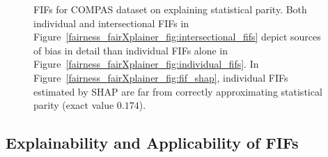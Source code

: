 \begin{figure}
	
	\caption[FIFs for COMPAS dataset]{FIFs for COMPAS dataset on explaining statistical parity. Both individual and intersectional FIFs in Figure~\ref{fairness_fairXplainer_fig:intersectional_fifs} depict sources of bias in detail than individual FIFs alone in Figure~\ref{fairness_fairXplainer_fig:individual_fifs}. In Figure~\ref{fairness_fairXplainer_fig:fif_shap}, individual FIFs estimated by SHAP are far from correctly approximating statistical parity (exact value $0.174 $).}
	\label{fairness_fairXplainer_fig:fif_illustration_compas}
\end{figure}



\subsection{Explainability and Applicability of FIFs}
